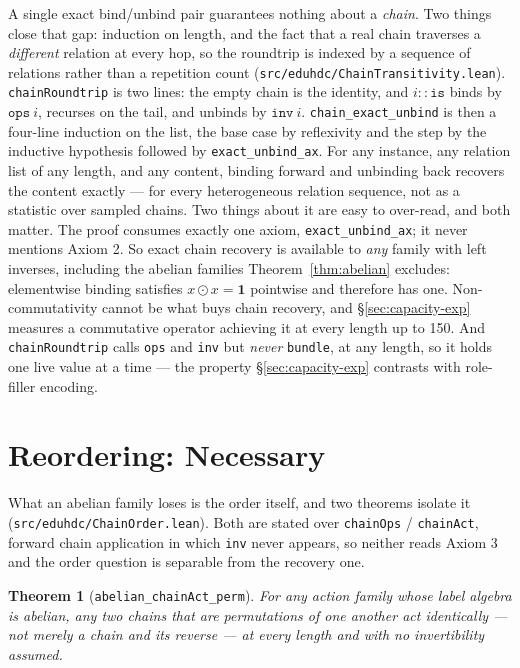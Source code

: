 \documentclass[10pt]{article}
\newtheorem{theorem}{Theorem}[section]
\begin{document}
A single exact bind/unbind pair guarantees nothing about a \emph{chain}. Two things close that gap: induction on length, and the fact that a real chain traverses a \emph{different} relation at every hop, so the roundtrip is indexed by a sequence of relations rather than a repetition count (\texttt{src/eduhdc/\allowbreak ChainTransitivity.lean}). \texttt{chainRoundtrip} is two lines: the empty chain is the identity, and $i :: \texttt{is}$ binds by $\texttt{ops}\ i$, recurses on the tail, and unbinds by $\texttt{inv}\ i$. \texttt{chain\_exact\_unbind} is then a four-line induction on the list, the base case by reflexivity and the step by the inductive hypothesis followed by \texttt{exact\_unbind\_ax}. For any instance, any relation list of any length, and any content, binding forward and unbinding back recovers the content exactly --- for every heterogeneous relation sequence, not as a statistic over sampled chains. Two things about it are easy to over-read, and both matter. The proof consumes exactly one axiom, \texttt{exact\_unbind\_ax}; it never mentions Axiom 2. So exact chain recovery is available to \emph{any} family with left inverses, including the abelian families Theorem~\ref{thm:abelian} excludes: elementwise binding satisfies $x \odot x = \mathbf{1}$ pointwise and therefore has one. Non-commutativity cannot be what buys chain recovery, and \S\ref{sec:capacity-exp} measures a commutative operator achieving it at every length up to 150. And \texttt{chainRoundtrip} calls \texttt{ops} and \texttt{inv} but \emph{never} \texttt{bundle}, at any length, so it holds one live value at a time --- the property \S\ref{sec:capacity-exp} contrasts with role-filler encoding.

\section{Reordering: Necessary}
\label{sec:reorder}

What an abelian family loses is the order itself, and two theorems isolate it (\texttt{src/eduhdc/\allowbreak ChainOrder.lean}). Both are stated over \texttt{chainOps} / \texttt{chainAct}, forward chain application in which \texttt{inv} never appears, so neither reads Axiom 3 and the order question is separable from the recovery one.

\begin{theorem}[\texttt{abelian\_chainAct\_perm}]
\label{thm:perm}
For any action family whose label algebra is abelian, any two chains that are permutations of one another act identically --- not merely a chain and its reverse --- at every length and with no invertibility assumed.
\end{theorem}
\end{document}
